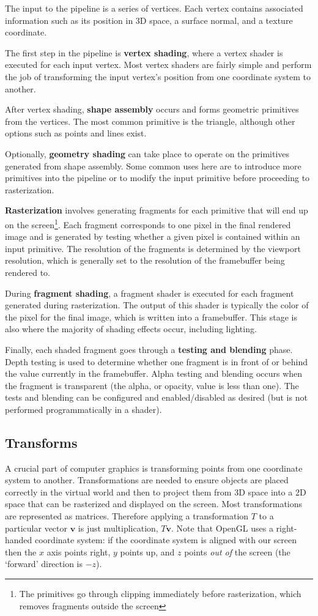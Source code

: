 The input to the pipeline is a series of vertices. Each vertex contains associated information such as its position in 3D space, a surface normal, and a texture coordinate.

The first step in the pipeline is \textbf{vertex shading}, where a vertex shader is executed for each input vertex. Most vertex shaders are fairly simple and perform the job of transforming the input vertex's position from one coordinate system to another.

After vertex shading, \textbf{shape assembly} occurs and forms geometric primitives from the vertices. The most common primitive is the triangle, although other options such as points and lines exist.

Optionally, \textbf{geometry shading} can take place to operate on the primitives generated from shape assembly. Some common uses here are to introduce more primitives into the pipeline or to modify the input primitive before proceeding to rasterization.

\textbf{Rasterization} involves generating fragments for each primitive that will end up on the screen\footnote{The primitives go through clipping immediately before rasterization, which removes fragments outside the screen}. Each fragment corresponds to one pixel in the final rendered image and is generated by testing whether a given pixel is contained within an input primitive. The resolution of the fragments is determined by the viewport resolution, which is generally set to the resolution of the framebuffer being rendered to.

During \textbf{fragment shading}, a fragment shader is executed for each fragment generated during rasterization. The output of this shader is typically the color of the pixel for the final image, which is written into a framebuffer. This stage is also where the majority of shading effects occur, including lighting.

Finally, each shaded fragment goes through a \textbf{testing and blending} phase. Depth testing is used to determine whether one fragment is in front of or behind the value currently in the framebuffer. Alpha testing and blending occurs when the fragment is transparent (the alpha, or opacity, value is less than one). The tests and blending can be configured and enabled/disabled as desired (but is not performed programmatically in a shader).

\subsection{Transforms}
A crucial part of computer graphics is transforming points from one coordinate system to another. Transformations are needed to ensure objects are placed correctly in the virtual world and then to project them from 3D space into a 2D space that can be rasterized and displayed on the screen. Most transformations are represented as matrices. Therefore applying a transformation $T$ to a particular vector $\bm{v}$ is just multiplication, $T \bm{v}$. Note that OpenGL uses a right-handed coordinate system: if the coordinate system is aligned with our screen then the $x$ axis points right, $y$ points up, and $z$ points \textit{out of} the screen (the `forward' direction is $-z$).


